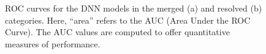 \begin{figure}[ht]
      \centering
       \caption{ROC curves for the DNN models in the merged (a) and resolved (b) categories. Here, ``area'' refers to the AUC (Area Under the ROC Curve). The AUC values are computed to offer quantitative measures of performance.}
       \label{fig:ROCChecks}
\end{figure}

